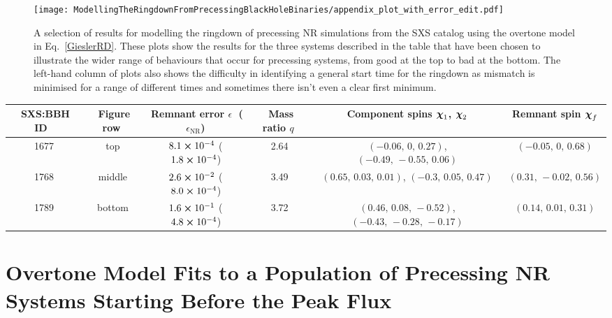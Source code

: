 \begin{figure}[h]
    \centering
    \texttt{[image: ModellingTheRingdownFromPrecessingBlackHoleBinaries/appendix\_plot\_with\_error\_edit.pdf]}
    \caption[Selection of results for modelling the ringdown of misaligned-spin SXS simulations using the overtone model]{ 
    A selection of results for modelling the ringdown of precessing NR simulations from the SXS catalog \cite{sxs, 2013PhRvL.111x1104M,sxs_catalog} using the overtone model in Eq.~\ref{GieslerRD}.
    These plots show the results for the three systems described in the table that have been chosen to illustrate the wider range of behaviours that occur for precessing systems, from good at the top to bad at the bottom.
    The left-hand column of plots also shows the difficulty in identifying a general start time for the ringdown as mismatch is minimised for a range of different times and sometimes there isn't even a clear first minimum.
    }
	\label{misaligned_spin_variation}
\end{figure}

\begin{footnotesize}
\begin{center}
\begin{tabular}{ c|c|c|c|c|c } 
$\;$SXS:BBH ID $\;$ & $\;$Figure row$\;$ & $\;$Remnant error $\epsilon$$\;$ ($\epsilon_{\mathrm{NR}}$) &  $\;$Mass ratio $q$$\;$ & Component spins $\vb*{\chi}_1$, $\vb*{\chi}_2$  & $\;$Remnant spin $\vb*{\chi}_f$$\;$ \\
\hline
1677 & top & $8.1 \cross 10^{-4}$ ($1.8 \cross 10^{-4}$) & 2.64 & $(-0.06,\,0,\,0.27)$, $(-0.49,\,-0.55,\,0.06)$ & $(-0.05,\,0,\,0.68)$ \\ 
1768 & middle & $2.6 \cross 10^{-2}$ ($8.0 \cross 10^{-4}$) & 3.49 & $(0.65,\,0.03,\,0.01)$, $(-0.3,\,0.05,\,0.47)$ & $(0.31,\,-0.02,\,0.56)$ \\ 
1789 & bottom & $1.6 \cross 10^{-1}$ ($4.8 \cross 10^{-4}$) & 3.72 & $(0.46,\,0.08,\,-0.52)$, $(-0.43,\,-0.28,\,-0.17)$ & $(0.14,\,0.01,\,0.31)$ \\ 
\end{tabular}
\end{center}
\end{footnotesize}


\section{Overtone Model Fits to a Population of Precessing NR Systems Starting Before the Peak Flux}\label{misaligned_spin_fits_appendix}

